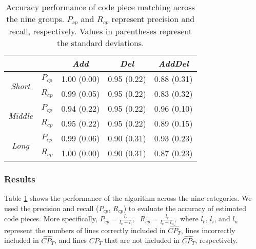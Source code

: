 \begin{table}[t]
    \centering
    \label{my-label}
    \begin{tabular}{cc||c|c| c}
                                                  &  & \textit{Add}           & \textit{Del}           & \textit{AddDel}        \\ \hline \hline 
\multirow{2}{*}{\textit{Short}}                     & $P_{cp}$ & 1.00 (0.00) & 0.95 (0.22) & 0.88 (0.31) \\
& $R_{cp}$ & 0.99 (0.05) & 0.95 (0.22) & 0.83 (0.32) \\ \hline
\multirow{2}{*}{\textit{Middle}}
& $P_{cp}$ & 0.94 (0.22) & 0.95 (0.22) & 0.96 (0.10)  \\
& $R_{cp}$ & 0.95 (0.22) & 0.95 (0.22) & 0.89 (0.15) \\ \hline
\multirow{2}{*}{\textit{Long}}
& $P_{cp}$ & 0.99 (0.06) & 0.90 (0.31) & 0.93 (0.23) \\
& $R_{cp}$ & 1.00 (0.00) & 0.90 (0.31) & 0.87 (0.23) \\
    \end{tabular}
    \caption{Accuracy performance of code piece matching across the nine groups. $P_{cp}$ and $R_{cp}$ represent precision and recall, respectively. Values in parentheses represent the standard deviations.}
    \label{table:performance}
    \vspace{-2mm}
\end{table}




\subsubsection{Results}
Table \ref{table:performance} shows the performance of the algorithm across the nine categories.
We used the precision and recall ($P_{cp}$, $R_{cp}$) to evaluate the accuracy of estimated code pieces.
More specifically, $P_{cp} = \frac{l_c}{l_c + l_i},\;\; R_{cp} = \frac{l_c}{l_c + l_n},$ where $l_c$, $l_i$, and $l_n$ represent the numbers of lines correctly included in $\widehat{CP_{T}}$, lines incorrectly included in $\widehat{CP_{T}}$, and lines $CP_{T}$ that are not included in $\widehat{CP_{T}}$, respectively.



